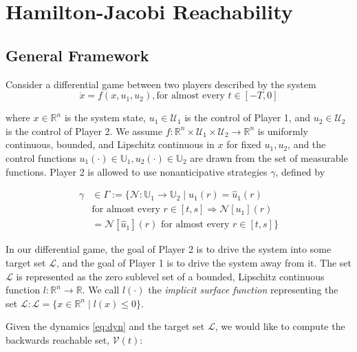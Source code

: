 \section{Hamilton-Jacobi Reachability  \label{sec:HJI}}
\subsection{General Framework}
Consider a differential game between two players described by the system
\begin{equation} \label{eq:dyn}
\dot{x} = f(x, u_1, u_2), \text{for almost every }t\in [-T,0]
\end{equation}

\noindent where $x\in\mathbb{R}^n$ is the system state, $u_1\in \mathcal{U}_1$ is the control of Player 1, and $u_2\in\mathcal{U}_2$ is the control of Player 2. We assume $f:\mathbb{R}^n\times \mathcal{U}_1 \times \mathcal{U}_2 \rightarrow \mathbb{R}^n$ is uniformly continuous, bounded, and Lipschitz continuous in $x$ for fixed $u_1,u_2$, and the control functions $u_1(\cdot)\in\mathbb{U}_1,u_2(\cdot)\in\mathbb{U}_2$ are drawn from the set of measurable functions. Player 2 is allowed to use nonanticipative strategies \cite{Evans84,Varaiya67} $\gamma$, defined by

\begin{equation}
\begin{aligned}
\gamma &\in \Gamma := \{\mathcal{N}: \mathbb{U}_1 \rightarrow \mathbb{U}_2 \mid  u_1(r) = \hat{u}_1(r) \\
&\text{for almost every } r\in[t,s] \Rightarrow \mathcal{N}[u_1](r) \\
&= \mathcal{N}[\hat{u}_1](r) \text{ for almost every } r\in[t,s]\}
\end{aligned}
\end{equation}

In our differential game, the goal of Player 2 is to drive the system into some target set $\mathcal{L}$, and the goal of Player 1 is to drive the system away from it. The set $\mathcal{L}$ is represented as the zero sublevel set of a bounded, Lipschitz continuous function $l:\mathbb{R}^n\rightarrow\mathbb{R}$. We call $l(\cdot)$ the \textit{implicit surface function} representing the set $\mathcal L: \mathcal{L}=\{x\in\mathbb{R}^n \mid l(x)\le 0\}$.

Given the dynamics \eqref{eq:dyn} and the target set $\mathcal{L}$, we would like to compute the backwards reachable set, $\mathcal{V}(t)$:

